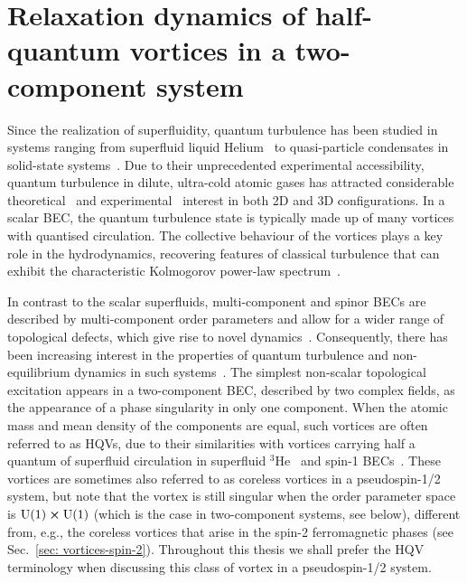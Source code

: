 \chapter{\label{chap: two-comp}Relaxation dynamics of half-quantum vortices in a
two-component system}

Since the realization of superfluidity, quantum turbulence has been studied
in systems ranging from superfluid liquid
Helium~\cite{Barenghi2014, Walmsley2014} to quasi-particle
condensates in solid-state systems~\cite{Kreil2018}.
Due to their unprecedented experimental accessibility, quantum turbulence in
dilute, ultra-cold atomic gases has attracted considerable
theoretical~\cite{Kobayashi2007,Numasato2010, Reeves2013, Billam2014,
Simula2014,Baggaley2018} and experimental~\cite{Henn2009,Kwon2014,Seo2017,
Navon2019,Gauthier2019, Johnstone2019} interest in both 2D and 3D
configurations.
In a scalar BEC, the quantum turbulence state is typically made up of many
vortices with quantised circulation.
The collective behaviour of the vortices plays a key role
in the hydrodynamics, recovering features of classical turbulence that can
exhibit the characteristic Kolmogorov power-law spectrum~\cite{Kobayashi2005}.

In contrast to the scalar superfluids, multi-component and spinor BECs are
described by multi-component order parameters and allow for a wider range of
topological defects, which give rise to novel dynamics~\cite{Kasamatsu2016,
    Weiss2019,Kobayashi2009,Kasamatsu2005}.
Consequently, there has been increasing interest in the properties of quantum
turbulence and non-equilibrium dynamics in such systems~\cite{Salman2009,
Schmied2019, Karl2013, Prufer2018, Hofmann2014}.
The simplest non-scalar topological excitation appears in a two-component BEC,
described by two complex fields, as the appearance of a phase singularity in
only one component.
When the atomic mass and mean density of the components are equal, such vortices
are often referred to as HQVs, due to their similarities
with vortices carrying half a quantum of superfluid circulation in superfluid
\(^3\)He~\cite{Autti2016} and spin-1 BECs~\cite{Leonhardt2000,Seo2015}.
These vortices are sometimes also referred to as coreless vortices in a
pseudospin-1/2 system, but note that the vortex is still singular when the
order parameter space is \(\text{U}(1) \cross \text{U}(1)\) (which is the case
in two-component systems, see below), different
from, e.g., the coreless vortices that arise in the spin-2 ferromagnetic
phases (see Sec.~\ref{sec: vortices-spin-2}).
Throughout this thesis we shall prefer the HQV terminology when discussing
this class of vortex in a pseudospin-1/2 system.

